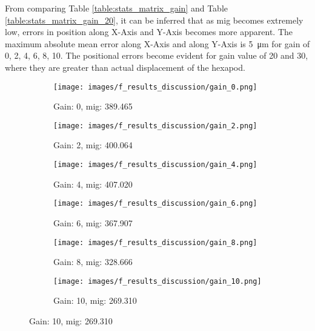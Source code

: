 \vspace{10mm}
\noindent From comparing Table \ref{table:stats_matrix_gain} and Table \ref{table:stats_matrix_gain_20}, it can be inferred that as \gls{mig} becomes extremely low, errors in position along X-Axis and Y-Axis becomes more apparent. The maximum absolute mean error along X-Axis and along Y-Axis is \SI{5}{\micro\meter} for gain of 0, 2, 4, 6, 8, 10. The positional errors become evident for gain value of 20 and 30, where they are greater than actual displacement of the hexapod.

\begin{figure}[h]
    \centering
    \begin{subfigure}[b]{0.4\textwidth}
        \centering
        \texttt{[image: images/f\_results\_discussion/gain\_0.png]}
        \caption{Gain: 0, \gls{mig}: 389.465}
        \label{subfig:underexposed.png}
    \end{subfigure}
    \hspace{1cm}
    \begin{subfigure}[b]{0.4\textwidth}
        \centering
        \texttt{[image: images/f\_results\_discussion/gain\_2.png]}
        \caption{Gain: 2, \gls{mig}: 400.064}
        \label{subfig:underexposed.png}
    \end{subfigure}

    \vspace{5mm}
    
    \begin{subfigure}[b]{0.4\textwidth}
        \centering
        \texttt{[image: images/f\_results\_discussion/gain\_4.png]}
        \caption{Gain: 4, \gls{mig}: 407.020}
        \label{subfig:underexposed.png}
    \end{subfigure}
    \hspace{1cm}
    \begin{subfigure}[b]{0.4\textwidth}
        \centering
        \texttt{[image: images/f\_results\_discussion/gain\_6.png]}
        \caption{Gain: 6, \gls{mig}: 367.907}
        \label{subfig:underexposed.png}
    \end{subfigure}

    \vspace{5mm}

    \begin{subfigure}[b]{0.4\textwidth}
        \centering
        \texttt{[image: images/f\_results\_discussion/gain\_8.png]}
        \caption{Gain: 8, \gls{mig}: 328.666}
        \label{subfig:underexposed.png}
    \end{subfigure}
    \hspace{1cm}
    \begin{subfigure}[b]{0.4\textwidth}
        \centering
        \texttt{[image: images/f\_results\_discussion/gain\_10.png]}
        \caption{Gain: 10, \gls{mig}: 269.310}
        \label{subfig:underexposed.png}
    \end{subfigure}


\end{figure}
